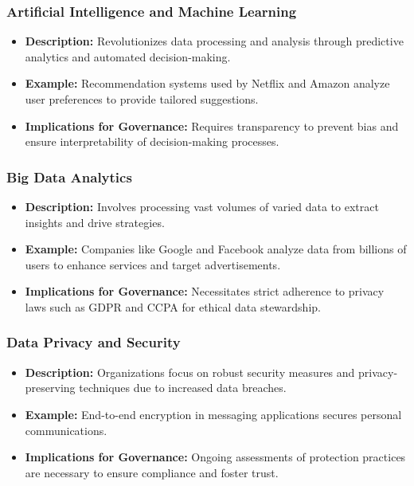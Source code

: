 \documentclass[aspectratio=169]{beamer}
\begin{document}
\begin{frame}[fragile]
    \frametitle{Artificial Intelligence and Machine Learning}
    \begin{itemize}
        \item \textbf{Description:} Revolutionizes data processing and analysis through predictive analytics and automated decision-making.
        \item \textbf{Example:} Recommendation systems used by Netflix and Amazon analyze user preferences to provide tailored suggestions.
        \item \textbf{Implications for Governance:} Requires transparency to prevent bias and ensure interpretability of decision-making processes.
    \end{itemize}
\end{frame}

\begin{frame}[fragile]
    \frametitle{Big Data Analytics}
    \begin{itemize}
        \item \textbf{Description:} Involves processing vast volumes of varied data to extract insights and drive strategies.
        \item \textbf{Example:} Companies like Google and Facebook analyze data from billions of users to enhance services and target advertisements.
        \item \textbf{Implications for Governance:} Necessitates strict adherence to privacy laws such as GDPR and CCPA for ethical data stewardship.
    \end{itemize}
\end{frame}

\begin{frame}[fragile]
    \frametitle{Data Privacy and Security}
    \begin{itemize}
        \item \textbf{Description:} Organizations focus on robust security measures and privacy-preserving techniques due to increased data breaches.
        \item \textbf{Example:} End-to-end encryption in messaging applications secures personal communications.
        \item \textbf{Implications for Governance:} Ongoing assessments of protection practices are necessary to ensure compliance and foster trust.
    \end{itemize}
\end{frame}
\end{document}
